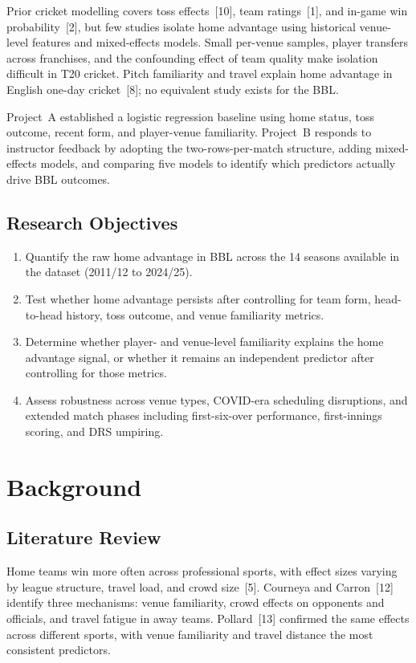 \documentclass[12pt,a4paper]{article}
\begin{document}
Prior cricket modelling covers toss effects~[10], team ratings~[1], and in-game win
probability~[2], but few studies isolate home advantage using historical venue-level features
and mixed-effects models. Small per-venue samples, player transfers across franchises, and the
confounding effect of team quality make isolation difficult in T20 cricket. Pitch familiarity
and travel explain home advantage in English one-day cricket~[8]; no equivalent study exists
for the BBL.

Project~A established a logistic regression baseline using home status, toss outcome, recent
form, and player-venue familiarity. Project~B responds to instructor feedback by adopting the
two-rows-per-match structure, adding mixed-effects models, and comparing five models to
identify which predictors actually drive BBL outcomes.

\subsection*{Research Objectives}

\begin{enumerate}
  \item Quantify the raw home advantage in BBL across the 14 seasons available in the dataset (2011/12 to 2024/25).
  \item Test whether home advantage persists after controlling for team form, head-to-head
    history, toss outcome, and venue familiarity metrics.
  \item Determine whether player- and venue-level familiarity explains the home advantage
    signal, or whether it remains an independent predictor after controlling for those metrics.
  \item Assess robustness across venue types, COVID-era scheduling disruptions, and extended
    match phases including first-six-over performance, first-innings scoring, and DRS umpiring.
\end{enumerate}

\section{Background}

\subsection{Literature Review}

Home teams win more often across professional sports, with effect sizes varying by league
structure, travel load, and crowd size~[5]. Courneya and Carron~[12] identify three
mechanisms: venue familiarity, crowd effects on opponents and officials, and travel fatigue
in away teams. Pollard~[13] confirmed the same effects across different sports, with venue familiarity and
travel distance the most consistent predictors.
\end{document}
